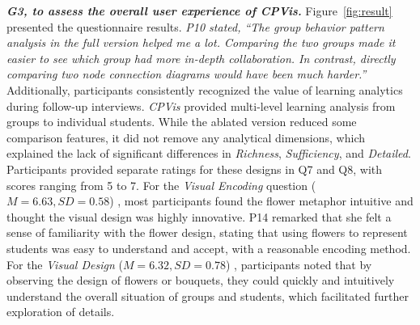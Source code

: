\textbf{\textit{G3, to assess the overall user experience of \textit{CPVis}. }}
Figure~\ref{fig:result} presented the questionnaire results. 
\textit{P10 stated, ``The group behavior pattern analysis in the full version helped me a lot. Comparing the two groups made it easier to see which group had more in-depth collaboration. In contrast, directly comparing two node connection diagrams would have been much harder.''}
Additionally, participants consistently recognized the value of learning analytics during follow-up interviews. \textit{CPVis} provided multi-level learning analysis from groups to individual students. While the ablated version reduced some comparison features, it did not remove any analytical dimensions, which explained the lack of significant differences in \textit{Richness}, \textit{Sufficiency}, and \textit{Detailed}. 
Participants provided separate ratings for these designs in Q7 and Q8, with scores ranging from 5 to 7. For the \textit{Visual Encoding} question ($M = 6.63, SD = 0.58$) , most participants found the flower metaphor intuitive and thought the visual design was highly innovative. 
P14 remarked that she felt a sense of familiarity with the flower design, stating that using flowers to represent students was easy to understand and accept, with a reasonable encoding method.
For the \textit{Visual Design} ($M = 6.32, SD = 0.78$) , participants noted that by observing the design of flowers or bouquets, they could quickly and intuitively understand the overall situation of groups and students, which facilitated further exploration of details. 
